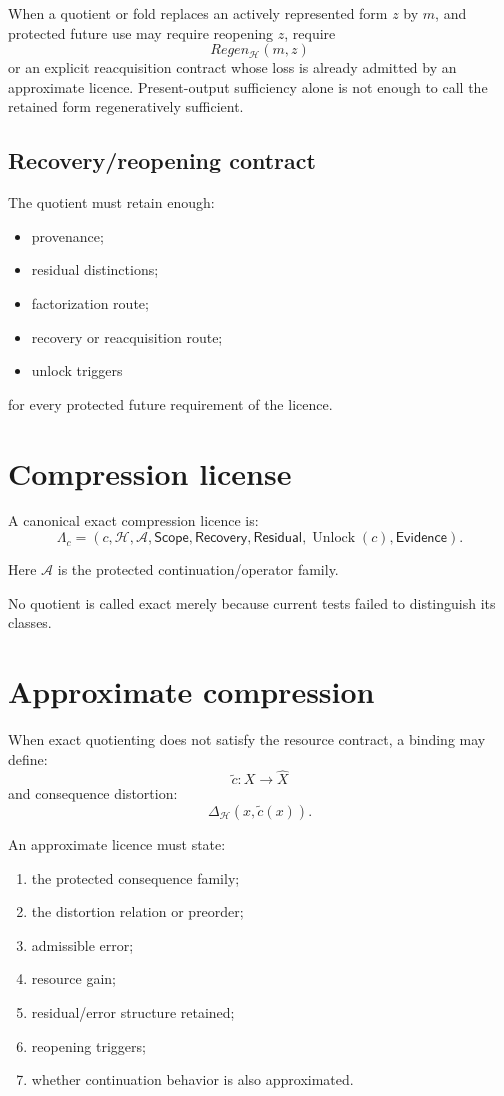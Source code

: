 \documentclass[11pt,oneside]{article}
\newcommand{\Unlock}{\operatorname{Unlock}}
\begin{document}
When a quotient or fold replaces an actively represented form \(z\) by \(m\), and protected future use may require reopening \(z\), require
\[
\boxed{
Regen_{\mathcal H}(m,z)
}
\]
or an explicit reacquisition contract whose loss is already admitted by an approximate licence.  Present-output sufficiency alone is not enough to call the retained form regeneratively sufficient.

\subsection{Recovery/reopening contract}

The quotient must retain enough:
\begin{itemize}
\item provenance;
\item residual distinctions;
\item factorization route;
\item recovery or reacquisition route;
\item unlock triggers
\end{itemize}
for every protected future requirement of the licence.

\section{Compression license}

A canonical exact compression licence is:
\[
\boxed{
\Lambda_c
=
(
c,\mathcal H,\mathcal A,
\mathsf{Scope},
\mathsf{Recovery},
\mathsf{Residual},
\Unlock(c),
\mathsf{Evidence}
).
}
\]

Here \(\mathcal A\) is the protected continuation/operator family.

No quotient is called exact merely because current tests failed to distinguish its classes.

\section{Approximate compression}

When exact quotienting does not satisfy the resource contract, a binding may define:
\[
\widetilde c:X\to\widehat X
\]
and consequence distortion:
\[
\boxed{
\Delta_{\mathcal H}(x,\widetilde c(x)).
}
\]

An approximate licence must state:
\begin{enumerate}
\item the protected consequence family;
\item the distortion relation or preorder;
\item admissible error;
\item resource gain;
\item residual/error structure retained;
\item reopening triggers;
\item whether continuation behavior is also approximated.
\end{enumerate}
\end{document}
